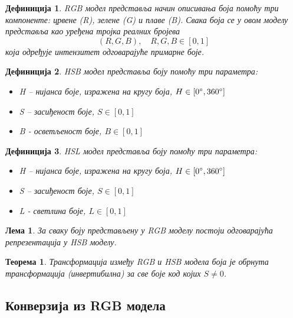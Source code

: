 \documentclass[A4, 11pt]{article}
\newtheorem{theorem}{Теорема}
\newtheorem{corollary}{Дефиниција}
\newtheorem{lemma}{Лема}
\begin{document}
\begin{corollary}
RGB модел представља начин описивања боја помоћу три компоненте: црвене (R), зелене (G) и плаве (B). Свака боја се у овом моделу представља као уређена тројка реалних бројева 
$$(R,G,B),\quad R,G,B \in [0,1]$$
која одређује интензитет одговарајуће примарне боје.
\end{corollary}

\begin{corollary}
HSB модел представља боју помоћу три параметра: 
\begin{itemize}
    \item H – нијанса боје, изражена на кругу боја, $H \in [0\degree, 360\degree]$ 
    \item S – засиђеност боје, $S \in [0, 1]$ 
    \item B - осветљеност боје, $B \in [0, 1]$ 
\end{itemize}
\end{corollary}

\begin{corollary}
HSL модел представља боју помоћу три параметра: 
\begin{itemize}
    \item H – нијанса боје, изражена на кругу боја, $H \in [0\degree, 360\degree]$ 
    \item S – засиђеност боје, $S \in [0, 1]$ 
    \item L - светлина боје, $L \in [0, 1]$ 
\end{itemize}
\end{corollary}

\begin{lemma}
\label{lema_rgb_hsb}
За сваку боју представљену у RGB моделу постоји одговарајућа репрезентација у HSB моделу.
\end{lemma}

\begin{theorem}
Трансформација између RGB и HSB модела боја је обрнута трансформација (инвертибилна) за све боје код којих $S \neq 0$.
\end{theorem}

\subsection{Конверзија из RGB модела}
\end{document}
